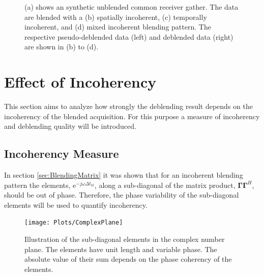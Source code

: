 \begin{figure}
	\caption{(a) shows an synthetic unblended common receiver gather. The data are blended with a (b) spatially incoherent, (c) temporally incoherent, and (d) mixed incoherent blending pattern. The respective pseudo-deblended data (left) and deblended data (right) are shown in (b) to (d).}
	\label{fig:Ch-Results-Debl-x-inline}

\end{figure}


\FloatBarrier
\section{Effect of Incoherency} \label{sec:Effect-of-Incoherency}

This section aims to analyze how strongly the deblending result depends on the incoherency of the blended acquisition. For this purpose a measure of incoherency and deblending quality will be introduced.

\subsection*{Incoherency Measure}



In section \ref{sec:BlendingMatrix} it was shown that for an incoherent blending pattern the elements, $\mathrm{e}^{-j \omega \Delta t_{kl}}$, along a sub-diagonal of the matrix product, $\mathbf{\Gamma \Gamma}^H$, should be out of phase. Therefore, the phase variability of the sub-diagonal elements will be used to quantify incoherency. 

\begin{figure}
	\centering
	\texttt{[image: Plots/ComplexPlane]}
	\caption{Illustration of the sub-diagonal elements in the complex number plane. The elements have unit length and variable phase. The absolute value of their sum depends on the phase coherency of the elements.}
	\label{fig:Ch-Results-complex-circle}
\end{figure}

